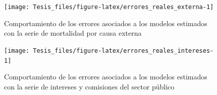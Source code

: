 \documentclass[
]{article}
\begin{document}
\begin{figure}[H]
\texttt{[image: Tesis\_files/figure-latex/errores\_reales\_externa-1]} \caption{Comportamiento de los errores asociados a los modelos estimados con la serie de mortalidad por causa externa}\label{fig:errores_reales_externa}
\end{figure}

\begin{figure}[H]
\texttt{[image: Tesis\_files/figure-latex/errores\_reales\_intereses-1]} \caption{Comportamiento de los errores asociados a los modelos estimados con la serie de intereses y comisiones del sector público}\label{fig:errores_reales_intereses}
\end{figure}

\begin{table}[H]


\end{table}
\end{document}
